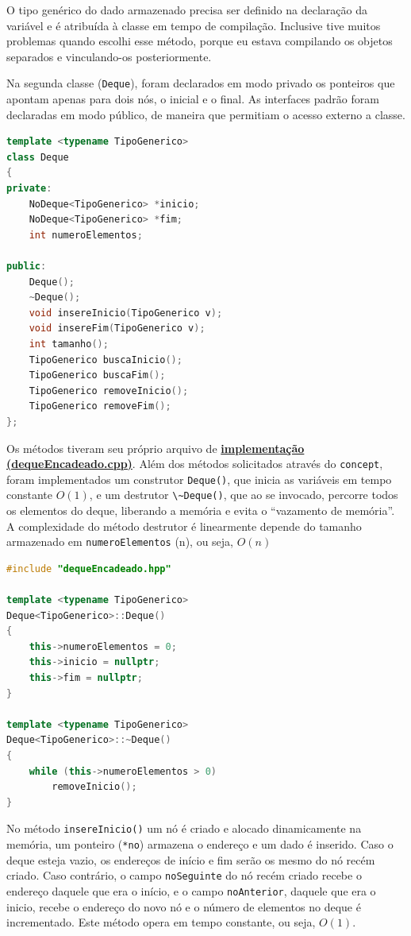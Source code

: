 \documentclass[
  brazilian,
  paper=a4,
  oneside  ,captions=tableheading
]{scrbook}
\newcommand{\passthrough}[1]{#1}
\begin{document}
O tipo genérico do dado armazenado precisa ser definido na declaração da
variável e é atribuída à classe em tempo de compilação. Inclusive tive
muitos problemas quando escolhi esse método, porque eu estava compilando
os objetos separados e vinculando-os posteriormente.

Na segunda classe (\passthrough{\lstinline!Deque!}), foram declarados em
modo privado os ponteiros que apontam apenas para dois nós, o inicial e
o final. As interfaces padrão foram declaradas em modo público, de
maneira que permitiam o acesso externo a classe.

\begin{lstlisting}[language={C++}]
template <typename TipoGenerico>
class Deque 
{
private:
    NoDeque<TipoGenerico> *inicio;
    NoDeque<TipoGenerico> *fim;
    int numeroElementos;

public:
    Deque();
    ~Deque();
    void insereInicio(TipoGenerico v);
    void insereFim(TipoGenerico v);
    int tamanho();
    TipoGenerico buscaInicio();
    TipoGenerico buscaFim();
    TipoGenerico removeInicio();
    TipoGenerico removeFim();
};
\end{lstlisting}

Os métodos tiveram seu próprio arquivo de
\href{https://github.com/ecostadelle/lista_pilhas_filas/blob/main/include/dequeEncadeado.cpp}{\textbf{implementação
(dequeEncadeado.cpp)}}. Além dos métodos solicitados através do
\passthrough{\lstinline!concept!}, foram implementados um construtor
\passthrough{\lstinline!Deque()!}, que inicia as variáveis em tempo
constante \(O(1)\), e um destrutor \passthrough{\lstinline!\~Deque()!},
que ao se invocado, percorre todos os elementos do deque, liberando a
memória e evita o ``vazamento de memória''. A complexidade do método
destrutor é linearmente depende do tamanho armazenado em
\passthrough{\lstinline!numeroElementos!} (n), ou seja, \(O(n)\)

\begin{lstlisting}[language={C++}]
#include "dequeEncadeado.hpp"

template <typename TipoGenerico>
Deque<TipoGenerico>::Deque()
{
    this->numeroElementos = 0;
    this->inicio = nullptr;
    this->fim = nullptr;
}

template <typename TipoGenerico>
Deque<TipoGenerico>::~Deque()
{
    while (this->numeroElementos > 0)
        removeInicio();
} 
\end{lstlisting}

No método \passthrough{\lstinline!insereInicio()!} um nó é criado e
alocado dinamicamente na memória, um ponteiro
(\passthrough{\lstinline!*no!}) armazena o endereço e um dado é
inserido. Caso o deque esteja vazio, os endereços de início e fim serão
os mesmo do nó recém criado. Caso contrário, o campo
\passthrough{\lstinline!noSeguinte!} do nó recém criado recebe o
endereço daquele que era o início, e o campo
\passthrough{\lstinline!noAnterior!}, daquele que era o inicio, recebe o
endereço do novo nó e o número de elementos no deque é incrementado.
Este método opera em tempo constante, ou seja, \(O(1)\).
\end{document}
